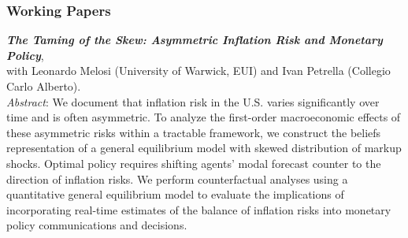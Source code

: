 \documentclass[a4paper,12pt]{article}
\begin{document}
\subsubsection*{Working Papers}
\textit{\textbf{The Taming of the Skew: Asymmetric Inflation Risk and Monetary Policy}},\\ with Leonardo Melosi (University of Warwick, EUI) and Ivan Petrella (Collegio Carlo Alberto).\\[.5em]
\textit{Abstract}: We document that inflation risk in the U.S. varies significantly over time and is often asymmetric. To analyze the first-order macroeconomic effects of these asymmetric risks within a tractable framework, we construct the beliefs representation of a general equilibrium model with skewed distribution of markup shocks. Optimal policy requires shifting agents’ modal forecast counter to the direction of inflation risks. We perform counterfactual analyses using a quantitative general equilibrium model to evaluate the implications of incorporating real-time estimates of the balance of inflation risks into monetary policy communications and decisions.\\[.5em]
\end{document}
